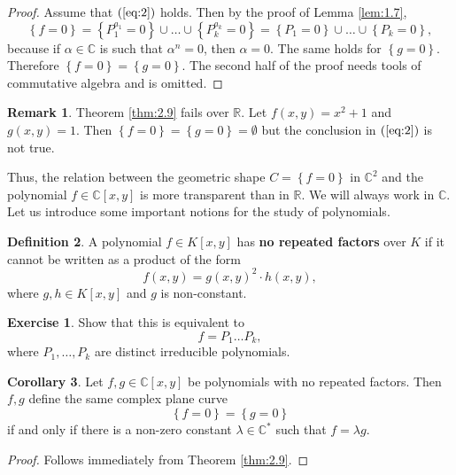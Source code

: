 \documentclass{article}
\newcommand{\R}{\mathbb{R}}
\newcommand{\C}{\mathbb{C}}
\newcommand{\rb}[1]{\left( #1 \right)}
\renewcommand{\sb}[1]{\left[ #1 \right]}
\newcommand{\cb}[1]{\left\{ #1 \right\}}
\theoremstyle{definition}\newtheorem{definition}{Definition}[section]
\theoremstyle{definition}\newtheorem{notation}[definition]{Notation}
\theoremstyle{definition}\newtheorem{remark}[definition]{Remark}
\theoremstyle{definition}\newtheorem{example}[definition]{Example}
\theoremstyle{definition}\newtheorem{fact}{Fact}
\theoremstyle{definition}\newtheorem{exercise}{Exercise}
\newtheorem{corollary}[definition]{Corollary}
\begin{document}

\begin{proof}
Assume that $ \rb{\ref{eq:2}} $ holds. Then by the proof of Lemma \ref{lem:1.7},
$$ \cb{f = 0} = \cb{P_1^{a_1} = 0} \cup \dots \cup \cb{P_k^{a_k} = 0} = \cb{P_1 = 0} \cup \dots \cup \cb{P_k = 0}, $$
because if $ \alpha \in \C $ is such that $ \alpha^n = 0 $, then $ \alpha = 0 $. The same holds for $ \cb{g = 0} $. Therefore $ \cb{f = 0} = \cb{g = 0} $. The second half of the proof needs tools of commutative algebra and is omitted.
\end{proof}

\begin{remark}
Theorem \ref{thm:2.9} fails over $ \R $. Let $ f\rb{x, y} = x^2 + 1 $ and $ g\rb{x, y} = 1 $. Then $ \cb{f = 0} = \cb{g = 0} = \emptyset $ but the conclusion in $ \rb{\ref{eq:2}} $ is not true.
\end{remark}

Thus, the relation between the geometric shape $ C = \cb{f = 0} $ in $ \C^2 $ and the polynomial $ f \in \C\sb{x, y} $ is more transparent than in $ \R $. We will always work in $ \C $. Let us introduce some important notions for the study of polynomials.

\begin{definition}
A polynomial $ f \in K\sb{x, y} $ has \textbf{no repeated factors} over $ K $ if it cannot be written as a product of the form
$$ f\rb{x, y} = g\rb{x, y}^2 \cdot h\rb{x, y}, $$
where $ g, h \in K\sb{x, y} $ and $ g $ is non-constant.
\end{definition}

\begin{exercise}
Show that this is equivalent to
$$ f = P_1 \dots P_k, $$
where $ P_1, \dots, P_k $ are distinct irreducible polynomials.
\end{exercise}

\begin{corollary}
Let $ f, g \in \C\sb{x, y} $ be polynomials with no repeated factors. Then $ f, g $ define the same complex plane curve
$$ \cb{f = 0} = \cb{g = 0} $$
if and only if there is a non-zero constant $ \lambda \in \C^* $ such that $ f = \lambda g $.
\end{corollary}

\begin{proof}
Follows immediately from Theorem \ref{thm:2.9}.
\end{proof}
\end{document}
